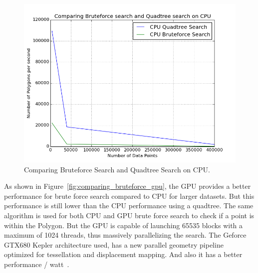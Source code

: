 \begin{figure}[H]
\centering
\vspace{0.5in}
    \includegraphics[scale=0.55]{Images/BruteVsQuadCPU_logscale_new_2}
    \vspace{0.5in}
    \caption{Comparing Bruteforce Search and Quadtree Search on CPU.}
    \label{fig:comparing_bruteforce_cpu}
  \end{figure}

As shown in Figure~\ref{fig:comparing_bruteforce_gpu}, the GPU provides a
better performance for brute force search compared to CPU for larger
datasets. But this performance is still lower than the CPU performance
using a quadtree. The same algorithm is used for both CPU and GPU
brute force search to check if a point is within the Polygon. But the
GPU is capable of launching 65535 blocks with a maximum of 1024
threads, thus massively parallelizing the search. The Geforce GTX680
Kepler architecture used, has a new parallel geometry pipeline
optimized for tessellation and displacement mapping. And also it has a
better performance / watt~\cite{nvidia:12:gtx680tech}.

